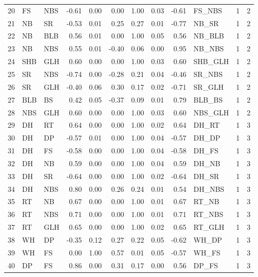 \begin{table}[ht]
\begin{tabular}{rllrrrrrrlrr}
  20 & FS & NBS & -0.61 & 0.00 & 0.00 & 1.00 & 0.03 & -0.61 & FS\_NBS &   1 &   2 \\ 
  21 & NB & SR & -0.53 & 0.01 & 0.25 & 0.27 & 0.01 & -0.77 & NB\_SR &   1 &   2 \\ 
  22 & NB & BLB & 0.56 & 0.01 & 0.00 & 1.00 & 0.05 & 0.56 & NB\_BLB &   1 &   2 \\ 
  23 & NB & NBS & 0.55 & 0.01 & -0.40 & 0.06 & 0.00 & 0.95 & NB\_NBS &   1 &   2 \\ 
  24 & SHB & GLH & 0.60 & 0.00 & 0.00 & 1.00 & 0.03 & 0.60 & SHB\_GLH &   1 &   2 \\ 
  25 & SR & NBS & -0.74 & 0.00 & -0.28 & 0.21 & 0.04 & -0.46 & SR\_NBS &   1 &   2 \\ 
  26 & SR & GLH & -0.40 & 0.06 & 0.30 & 0.17 & 0.02 & -0.71 & SR\_GLH &   1 &   2 \\ 
  27 & BLB & BS & 0.42 & 0.05 & -0.37 & 0.09 & 0.01 & 0.79 & BLB\_BS &   1 &   2 \\ 
  28 & NBS & GLH & 0.60 & 0.00 & 0.00 & 1.00 & 0.03 & 0.60 & NBS\_GLH &   1 &   2 \\ 
  29 & DH & RT & 0.64 & 0.00 & 0.00 & 1.00 & 0.02 & 0.64 & DH\_RT &   1 &   3 \\ 
  30 & DH & DP & -0.57 & 0.01 & 0.00 & 1.00 & 0.04 & -0.57 & DH\_DP &   1 &   3 \\ 
  31 & DH & FS & -0.58 & 0.00 & 0.00 & 1.00 & 0.04 & -0.58 & DH\_FS &   1 &   3 \\ 
  32 & DH & NB & 0.59 & 0.00 & 0.00 & 1.00 & 0.04 & 0.59 & DH\_NB &   1 &   3 \\ 
  33 & DH & SR & -0.64 & 0.00 & 0.00 & 1.00 & 0.02 & -0.64 & DH\_SR &   1 &   3 \\ 
  34 & DH & NBS & 0.80 & 0.00 & 0.26 & 0.24 & 0.01 & 0.54 & DH\_NBS &   1 &   3 \\ 
  35 & RT & NB & 0.67 & 0.00 & 0.00 & 1.00 & 0.01 & 0.67 & RT\_NB &   1 &   3 \\ 
  36 & RT & NBS & 0.71 & 0.00 & 0.00 & 1.00 & 0.01 & 0.71 & RT\_NBS &   1 &   3 \\ 
  37 & RT & GLH & 0.65 & 0.00 & 0.00 & 1.00 & 0.02 & 0.65 & RT\_GLH &   1 &   3 \\ 
  38 & WH & DP & -0.35 & 0.12 & 0.27 & 0.22 & 0.05 & -0.62 & WH\_DP &   1 &   3 \\ 
  39 & WH & FS & 0.00 & 1.00 & 0.57 & 0.01 & 0.05 & -0.57 & WH\_FS &   1 &   3 \\ 
  40 & DP & FS & 0.86 & 0.00 & 0.31 & 0.17 & 0.00 & 0.56 & DP\_FS &   1 &   3 \\ 

\end{tabular}
\end{table}
